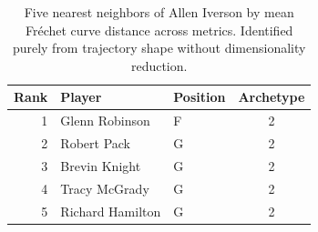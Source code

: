 \begin{table}[htbp]
  \centering\small
  \begin{tabular}{rllc}
    \toprule
    Rank & Player & Position & Archetype \\
    \midrule
    1 & Glenn Robinson & F & 2 \\
    2 & Robert Pack & G & 2 \\
    3 & Brevin Knight & G & 2 \\
    4 & Tracy McGrady & G & 2 \\
    5 & Richard Hamilton & G & 2 \\
    \bottomrule
  \end{tabular}
  \caption{Five nearest neighbors of Allen Iverson by mean Fr\'{e}chet curve distance across metrics. Identified purely from trajectory shape without dimensionality reduction.}
  \label{tab:Allen_Iverson_frechet_curve_neighbors}
\end{table}


